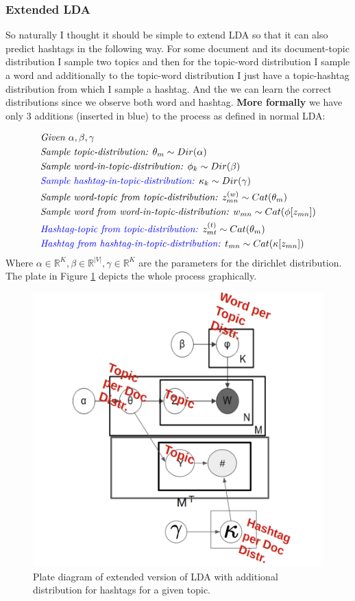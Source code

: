 \documentclass[10pt,conference,compsocconf]{IEEEtran}
\newcommand\R{\mathbb{R}}
\begin{document}
\subsubsection{Extended LDA}
So naturally I thought it should be simple to extend LDA so that it can also predict hashtags in the following way. For some document and its document-topic distribution I sample two topics and then for the topic-word distribution I sample a word and additionally to the topic-word distribution I just have a topic-hashtag distribution from which I sample a hashtag. And the we can learn the correct distributions since we observe both word and hashtag. \textbf{More formally} we have only 3 additions (inserted in blue) to the process as defined in normal LDA: 

\small
\begin{align*}
&\textit{Given } \alpha, \beta, \gamma \\
&\textit{Sample topic-distribution: } \theta_m \sim Dir(\alpha)\\
&\textit{Sample word-in-topic-distribution: } \phi_k \sim Dir(\beta) \\
& \textcolor{blue}{\textit{Sample hashtag-in-topic-distribution: }} \kappa_k \sim Dir(\gamma) \\
&\textit{Sample word-topic from topic-distribution: } z^{(w)}_{mn} \sim Cat(\theta_m) \\
&\textit{Sample word from word-in-topic-distribution: } w_{mn} \sim Cat(\phi[z_{mn}])\\
&\textcolor{blue}{\textit{Hashtag-topic from topic-distribution: }} z^{(t)}_{mt} \sim Cat(\theta_m) \\
&\textcolor{blue}{\textit{Hashtag from hashtag-in-topic-distribution: }} t_{mn} \sim Cat(\kappa[z_{mn}])\\
\end{align*}
\normalsize
Where $\alpha \in \R^K, \beta \in \R^{|V|}, \gamma \in \R^K$ are the parameters for the dirichlet distribution. The plate in Figure \ref{fig:ldaplate2} depicts the whole process graphically.
\begin{figure}
	\centering
	\includegraphics[width=0.7\linewidth]{images/extended_lda}
	\caption{Plate diagram of extended version of LDA with additional distribution for hashtags for a given topic. }
	\label{fig:ldaplate2}
\end{figure}
\end{document}
